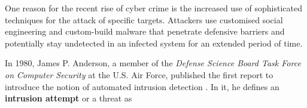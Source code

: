 One reason for the recent rise of cyber crime is the increased use of sophisticated techniques for the attack of specific targets. Attackers use customised social engineering and custom-build malware that penetrate defensive barriers and potentially stay undetected in an infected system for an extended period of time. 









In 1980, James P. Anderson, a member of the \textit{Defense Science Board Task Force on Computer Security} at the U.S. Air Force, published the first report to introduce the notion of automated intrusion detection \cite{anderson1980computer}. In it, he defines an \textbf{intrusion attempt} or a threat as 

